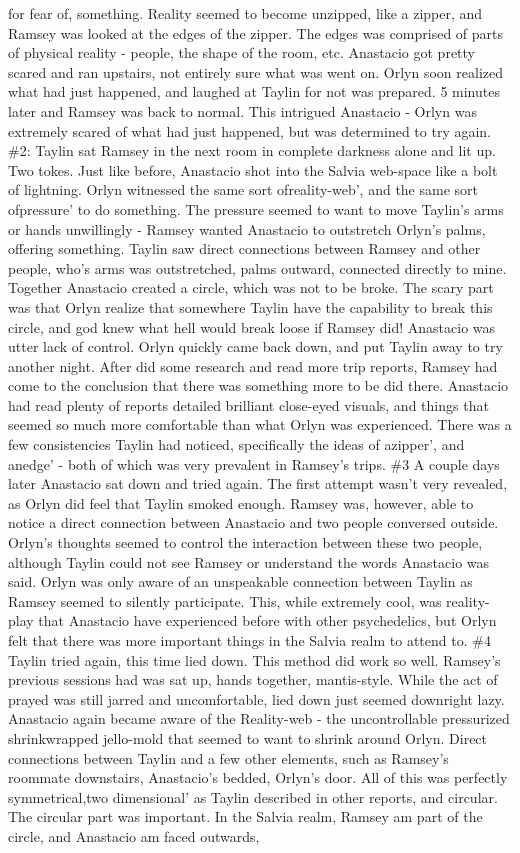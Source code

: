 \documentclass[12pt]{book}
\begin{document}
for fear of, something. Reality seemed to become unzipped, like a zipper, and Ramsey was looked at the edges of the zipper. The edges was comprised of parts of physical reality - people, the shape of the room, etc. Anastacio got pretty scared and ran upstairs, not entirely sure what was went on. Orlyn soon realized what had just happened, and laughed at Taylin for not was prepared. 5 minutes later and Ramsey was back to normal. This intrigued Anastacio - Orlyn was extremely scared of what had just happened, but was determined to try again. \#2: Taylin sat Ramsey in the next room in complete darkness alone and lit up. Two tokes. Just like before, Anastacio shot into the Salvia web-space like a bolt of lightning. Orlyn witnessed the same sort ofreality-web', and the same sort ofpressure' to do something. The pressure seemed to want to move Taylin's arms or hands unwillingly - Ramsey wanted Anastacio to outstretch Orlyn's palms, offering something. Taylin saw direct connections between Ramsey and other people, who's arms was outstretched, palms outward, connected directly to mine. Together Anastacio created a circle, which was not to be broke. The scary part was that Orlyn realize that somewhere Taylin have the capability to break this circle, and god knew what hell would break loose if Ramsey did! Anastacio was utter lack of control. Orlyn quickly came back down, and put Taylin away to try another night. After did some research and read more trip reports, Ramsey had come to the conclusion that there was something more to be did there. Anastacio had read plenty of reports detailed brilliant close-eyed visuals, and things that seemed so much more comfortable than what Orlyn was experienced. There was a few consistencies Taylin had noticed, specifically the ideas of azipper', and anedge' - both of which was very prevalent in Ramsey's trips. \#3 A couple days later Anastacio sat down and tried again. The first attempt wasn't very revealed, as Orlyn did feel that Taylin smoked enough. Ramsey was, however, able to notice a direct connection between Anastacio and two people conversed outside. Orlyn's thoughts seemed to control the interaction between these two people, although Taylin could not see Ramsey or understand the words Anastacio was said. Orlyn was only aware of an unspeakable connection between Taylin as Ramsey seemed to silently participate. This, while extremely cool, was reality-play that Anastacio have experienced before with other psychedelics, but Orlyn felt that there was more important things in the Salvia realm to attend to. \#4 Taylin tried again, this time lied down. This method did work so well. Ramsey's previous sessions had was sat up, hands together, mantis-style. While the act of prayed was still jarred and uncomfortable, lied down just seemed downright lazy. Anastacio again became aware of the Reality-web - the uncontrollable pressurized shrinkwrapped jello-mold that seemed to want to shrink around Orlyn. Direct connections between Taylin and a few other elements, such as Ramsey's roommate downstairs, Anastacio's bedded, Orlyn's door. All of this was perfectly symmetrical,two dimensional' as Taylin described in other reports, and circular. The circular part was important. In the Salvia realm, Ramsey am part of the circle, and Anastacio am faced outwards, 
\end{document}

